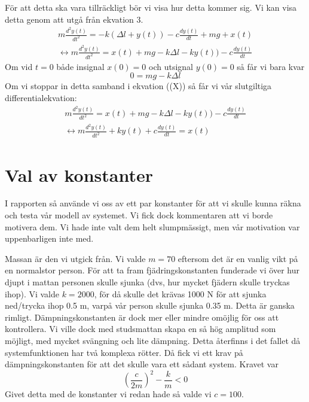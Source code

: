 \documentclass[10pt,a4paper]{article}
\begin{document}
För att detta ska vara tillräckligt bör vi visa hur detta kommer sig. Vi kan visa detta genom att utgå från ekvation 3.
\begin{equation}
\begin{split}
 m\frac{d^2y(t)}{dt^2} =  -k(\Delta l + y(t)) -c\frac{dy(t)}{dt} + mg +  x(t) \\ \leftrightarrow m\frac{d^2y(t)}{dt^2} = x(t) + mg  - k \Delta l -  k y(t)) -c\frac{dy(t)}{dt}  
\end{split}
\end{equation}
Om vid $t = 0$ både insignal $x(0) = 0$ och utsignal $y(0) = 0$ så får vi bara kvar
\begin{equation}
0 = mg  - k \Delta l
\end{equation}
Om vi stoppar in detta samband i ekvation ((X)) så får vi vår slutgiltiga differentialekvation:
\begin{equation}
\begin{split}
m\frac{d^2y(t)}{dt^2} = x(t) + mg  - k \Delta l -  k y(t)) -c\frac{dy(t)}{dt} \\ \leftrightarrow
 m\frac{d^2y(t)}{dt^2} + k  y(t) + c\frac{dy(t)}{dt} = x(t)
 \end{split}
\end{equation}

\section{Val av konstanter}

I rapporten så använde vi oss av ett par konstanter för att vi skulle kunna räkna och testa vår modell av systemet. Vi fick dock kommentaren att vi borde motivera dem. Vi hade inte valt dem helt slumpmässigt, men vår motivation var uppenbarligen inte med.

Massan är den vi utgick från. Vi valde $m = 70$ eftersom det är en vanlig vikt på en normalstor person. För att ta fram fjädringskonstanten funderade vi över hur djupt i mattan personen skulle sjunka (dvs, hur mycket fjädern skulle tryckas ihop). Vi valde $k = 2000$, för då skulle det krävas 1000 N för att sjunka ned/trycka ihop 0.5 m, varpå vår person skulle sjunka 0.35 m. Detta är ganska rimligt. Dämpningskonstanten är dock mer eller mindre omöjlig för oss att kontrollera. Vi ville dock med studsmattan skapa en så hög amplitud som möjligt, med mycket svängning och lite dämpning. Detta återfinns i det fallet då systemfunktionen har två komplexa rötter. Då fick vi ett krav på dämpningskonstanten för att det skulle vara ett sådant system. Kravet var
\begin{equation}
(\frac{c}{2m})^2 - \frac{k}{m} < 0
\end{equation}
Givet detta med de konstanter vi redan hade så valde vi $c = 100$.
\end{document}
